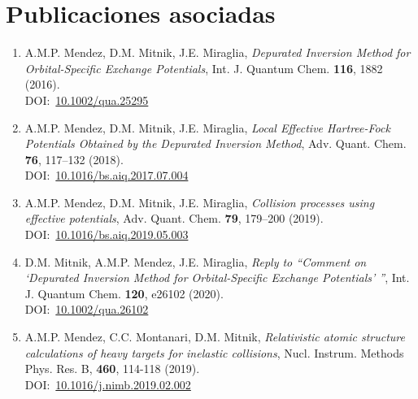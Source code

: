 \chapter*{Publicaciones asociadas}%
%


\begin{enumerate}

\item
A.M.P. Mendez, D.M. Mitnik, J.E. Miraglia,
\textit{Depurated Inversion Method for Orbital-Specific Exchange Potentials},
Int. J. Quantum Chem. \textbf{116}, 1882 (2016). \\
DOI:~\href{http://www.doi.org/10.1002/qua.25295}{10.1002/qua.25295}

\item
A.M.P. Mendez, D.M. Mitnik, J.E. Miraglia, 
\textit{Local Effective Hartree-Fock Potentials Obtained by the Depurated Inversion Method},
Adv. Quant. Chem. \textbf{76}, 117--132 (2018). \\
DOI:~\href{http://www.doi.org/10.1016/bs.aiq.2017.07.004}{10.1016/bs.aiq.2017.07.004}

\item
A.M.P. Mendez, D.M. Mitnik, J.E. Miraglia, 
\textit{Collision processes using effective potentials},
Adv. Quant. Chem. \textbf{79}, 179--200 (2019). \\
DOI:~\href{http://www.doi.org/10.1016/bs.aiq.2019.05.003}{10.1016/bs.aiq.2019.05.003}

\item
D.M. Mitnik, A.M.P. Mendez, J.E. Miraglia, 
\textit{Reply to ``Comment on `Depurated Inversion Method for Orbital-Specific
Exchange Potentials' ''}, 
Int. J. Quantum Chem. \textbf{120}, e26102 (2020). \\
DOI:~\href{http://www.doi.org/10.1002/qua.26102}{10.1002/qua.26102}

\item
A.M.P. Mendez, C.C. Montanari, D.M. Mitnik, 
\textit{Relativistic atomic structure calculations of heavy targets for inelastic collisions},
Nucl. Instrum. Methods Phys. Res. B, \textbf{460}, 114-118 (2019). \\
DOI:~\href{http://www.doi.org/10.1016/j.nimb.2019.02.002}{10.1016/j.nimb.2019.02.002}


\end{enumerate}
